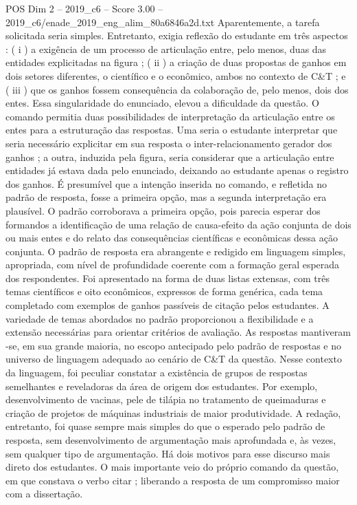 \begin{textsample}{POS Dim 2 – 2019\_c6 – Score 3.00 – 2019\_c6/enade\_2019\_eng\_alim\_80a6846a2d.txt}
Aparentemente, a tarefa solicitada seria simples.
Entretanto, exigia reflexão do estudante em três aspectos : ( i ) a exigência de um processo de articulação entre, pelo menos, duas das entidades explicitadas na figura ; ( ii ) a criação de duas propostas de ganhos em dois setores diferentes, o científico e o econômico, ambos no contexto de C\&T ; e ( iii ) que os ganhos fossem consequência da colaboração de, pelo menos, dois dos entes.
Essa singularidade do enunciado, elevou a dificuldade da questão.
O comando permitia duas possibilidades de interpretação da articulação entre os entes para a estruturação das respostas.
Uma seria o estudante interpretar que seria necessário explicitar em sua resposta o inter-relacionamento gerador dos ganhos ; a outra, induzida pela figura, seria considerar que a articulação entre entidades já estava dada pelo enunciado, deixando ao estudante apenas o registro dos ganhos.
É presumível que a intenção inserida no comando, e refletida no padrão de resposta, fosse a primeira opção, mas a segunda interpretação era plausível.
O padrão corroborava a primeira opção, pois parecia esperar dos formandos a identificação de uma relação de causa-efeito da ação conjunta de dois ou mais entes e do relato das consequências científicas e econômicas dessa ação conjunta.
O padrão de resposta era abrangente e redigido em linguagem simples, apropriada, com nível de profundidade coerente com a formação geral esperada dos respondentes.
Foi apresentado na forma de duas listas extensas, com três temas científicos e oito econômicos, expressos de forma genérica, cada tema completado com exemplos de ganhos passíveis de citação pelos estudantes.
A variedade de temas abordados no padrão proporcionou a flexibilidade e a extensão necessárias para orientar critérios de avaliação.
As respostas mantiveram -se, em sua grande maioria, no escopo antecipado pelo padrão de respostas e no universo de linguagem adequado ao cenário de C\&T da questão.
Nesse contexto da linguagem, foi peculiar constatar a existência de grupos de respostas semelhantes e reveladoras da área de origem dos estudantes.
Por exemplo, desenvolvimento de vacinas, pele de tilápia no tratamento de queimaduras e criação de projetos de máquinas industriais de maior produtividade.
A redação, entretanto, foi quase sempre mais simples do que o esperado pelo padrão de resposta, sem desenvolvimento de argumentação mais aprofundada e, às vezes, sem qualquer tipo de argumentação.
Há dois motivos para esse discurso mais direto dos estudantes.
O mais importante veio do próprio comando da questão, em que constava o verbo citar ; liberando a resposta de um compromisso maior com a dissertação.

\end{textsample}
